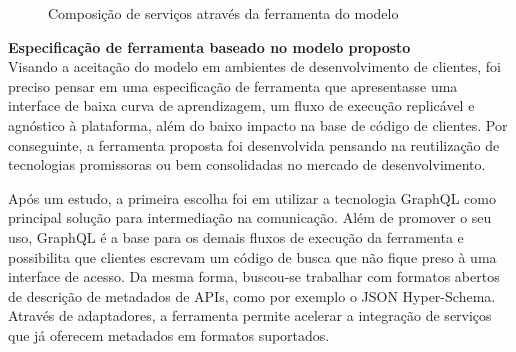 \begin{figure}[H]
  \centering
  \caption{Composição de serviços através da ferramenta do modelo}
\end{figure}

\textbf{Especificação de ferramenta baseado no modelo proposto} \\

Visando a aceitação do modelo em ambientes de desenvolvimento de clientes, foi preciso pensar em uma especificação de ferramenta que apresentasse uma interface de baixa curva de aprendizagem, um fluxo de execução replicável e agnóstico à plataforma, além do baixo impacto na base de código de clientes. Por conseguinte, a ferramenta proposta foi desenvolvida pensando na reutilização de tecnologias promissoras ou bem consolidadas no mercado de desenvolvimento.

Após um estudo, a primeira escolha foi em utilizar a tecnologia GraphQL como principal solução para intermediação na comunicação. Além de promover o seu uso, GraphQL é a base para os demais fluxos de execução da ferramenta e possibilita que clientes escrevam um código de busca que não fique preso à uma interface de acesso. Da mesma forma, buscou-se trabalhar com formatos abertos de descrição de metadados de APIs, como por exemplo o JSON Hyper-Schema. Através de adaptadores, a ferramenta permite acelerar a integração de serviços que já oferecem metadados em formatos suportados.

